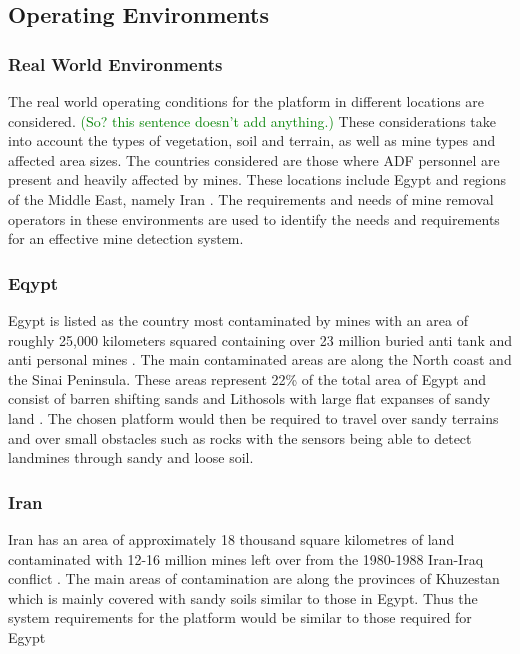 \documentclass[main.tex]{subfiles}
\begin{document}
\subsection{Operating Environments}
\subsubsection{Real World Environments}
The real world operating conditions for the platform in different locations are considered. \textcolor{green}{(So? this sentence doesn't add anything.)} These considerations take into account the types of vegetation, soil and terrain, as well as mine types and affected area sizes. The countries considered are those where ADF personnel are present and heavily affected by mines. These locations include Egypt and regions of the Middle East, namely Iran \parencite{AustralianGovernment2016}. The requirements and needs of mine removal operators in these environments are used to identify the needs and requirements for an effective mine detection system.

\subsubsection{Eqypt}
Egypt is listed as the country most contaminated by mines with an area of roughly 25,000 kilometers squared containing over 23 million buried anti tank and anti personal mines \parencite{Rushfan2008}. The main contaminated areas are along the North coast and the Sinai Peninsula. These areas represent 22\% of the total area of Egypt and consist of barren shifting sands and Lithosols with large flat expanses of sandy land \parencite{Nahrawy2011}. 
 The chosen platform would then be required to travel over sandy terrains and over small obstacles such as rocks with the sensors being able to detect landmines through sandy and loose soil. 
 \subsubsection{Iran}
 Iran has an area of approximately 18 thousand square kilometres of land contaminated with 12-16 million mines left over from the 1980-1988 Iran-Iraq conflict \parencite{landmineMonitor2015}. The main areas of contamination are along the provinces of Khuzestan which is mainly covered with sandy soils similar to those in Egypt. Thus the system requirements for the platform would be similar to those required for Egypt
\end{document}
